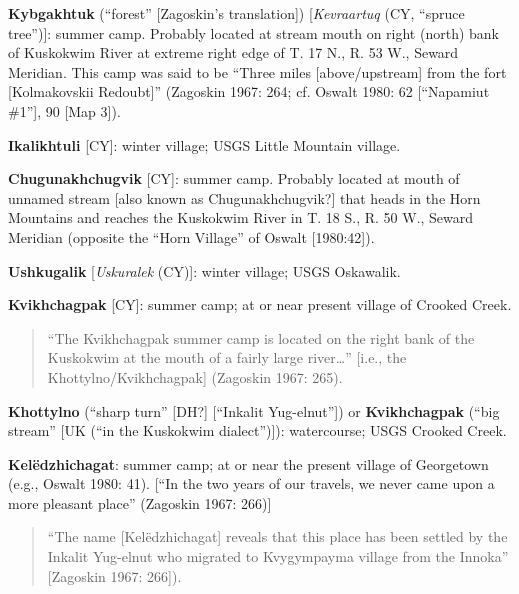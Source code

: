 \begin{hang}

\textbf{Kybgakhtuk} (“forest” [Zagoskin’s translation]) [\textit{Kevraartuq} (CY, “spruce tree”)]: summer camp. Probably located at stream mouth on right (north) bank of Kuskokwim River at extreme right edge of T. 17 N., R. 53 W., Seward Meridian. This camp was said to be “Three miles [above/upstream] from the fort [Kolmakovskii Redoubt]” (Zagoskin 1967: 264; cf. Oswalt 1980: 62 [“Napamiut \#1”], 90 [Map 3]).



\textbf{Ikalikhtuli} [CY]: winter village; USGS Little Mountain village.



\textbf{Chugunakhchugvik} [CY]: summer camp. Probably located at mouth of unnamed stream [also known as Chugunakhchugvik?] that heads in the Horn Mountains and reaches the Kuskokwim River in T. 18 S., R. 50 W., Seward Meridian (opposite the “Horn Village” of Oswalt [1980:42]).



\textbf{Ushkugalik} [\textit{Uskuralek} (CY)]: winter village; USGS Oskawalik.



\textbf{Kvikhchagpak} [CY]: summer camp; at or near present village of Crooked Creek.



\begin{quote}“The Kvikhchagpak summer camp is located on the right bank of the Kuskokwim at the mouth of a fairly large river…” [i.e., the Khottylno/Kvikhchagpak] (Zagoskin 1967: 265).
\end{quote}



\textbf{Khottylno} (“sharp turn” [DH?] [“Inkalit Yug-elnut”]) or \textbf{Kvikhchagpak} (“big stream” [UK (“in the Kuskokwim dialect”)]): watercourse; USGS Crooked Creek.



\textbf{Kelëdzhichagat}: summer camp; at or near the present village of Georgetown (e.g., Oswalt 1980: 41). [“In the two years of our travels, we never came upon a more pleasant place” (Zagoskin 1967: 266)]



\begin{quote}“The name [Kelëdzhichagat] reveals that this place has been settled by the Inkalit Yug-elnut who migrated to Kvygympayma village from the Innoka” [Zagoskin 1967: 266]).
\end{quote}




\end{hang}
